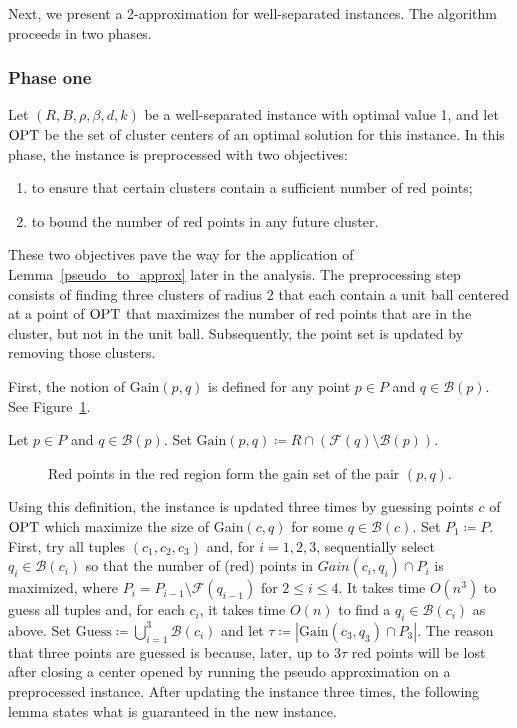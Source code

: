 Next, we present a 2-approximation for well-separated instances.
The algorithm proceeds in two phases. 


\subsubsection{Phase one}

Let $(R, B, \rho, \beta, d, k)$ be a well-separated instance with optimal value 1, and let $\operatorname{OPT}$ be the set of cluster centers of an optimal solution for this instance. 
In this phase, the instance is preprocessed with two objectives:
\begin{enumerate}
    \item to ensure that certain clusters contain a sufficient number of red points;
    \item to bound the number of red points in any future cluster.
\end{enumerate}
These two objectives pave the way for the application of Lemma~\ref{pseudo_to_approx} later in the analysis.
The preprocessing step consists of finding three clusters of radius 2 that each contain a unit ball centered at a point of $\operatorname{OPT}$ that maximizes the number of red points that are in the cluster, but not in the unit ball.  
Subsequently, the point set is updated by removing those clusters.

First, the notion of $\mathrm{Gain}(p,q)$ is defined for any point $p \in P$ and $q \in \mathcal{B}(p)$. See Figure~\ref{Fig2}.

\begin{definition}
    Let $p \in P$ and $q \in \mathcal{B}(p)$. Set $\mathrm{Gain}(p,q) \coloneqq R \cap \left(\mathcal{F}(q) \setminus \mathcal{B}(p)\right)$.
\end{definition}

\begin{figure}[h]
    \centering
    
    \caption{Red points in the red region form the gain set of the pair $(p,q)$.}
    \label{Fig2}
\end{figure}

Using this definition, the instance is updated three times by guessing points $c$ of $\operatorname{OPT}$ which maximize the size of Gain$(c,q)$ for some $q \in \mathcal{B}(c)$.
Set $P_1\coloneqq P$.
First, try all tuples $(c_1, c_2, c_3)$ and, for $i = 1, 2, 3$, sequentially select $q_i \in \mathcal{B}(c_i)$ so that the number of (red) points in $Gain(c_i, q_i) \cap P_i$ is maximized, where
        \( P_i = P_{i-1} \setminus \mathcal{F}(q_{i-1}) \text{ for } 2 \le i \le 4. \)
It takes time $O(n^3)$ to guess all tuples and, for each $c_i$, it takes time $O(n)$ to find a $q_i \in \mathcal{B}(c_i)$ as above. 
Set $\mathrm{Guess} \coloneqq \bigcup_{i =1}^3 \mathcal{B}(c_i)$ and let $\tau \coloneqq |\mathrm{Gain}(c_3,q_3) \cap P_3|$. 
The reason that three points are guessed is because, later, up to $3\tau$ red points will be lost after closing a center opened by running the pseudo approximation on a preprocessed instance. 
After updating the instance three times, the following lemma states what is guaranteed in the new instance.

